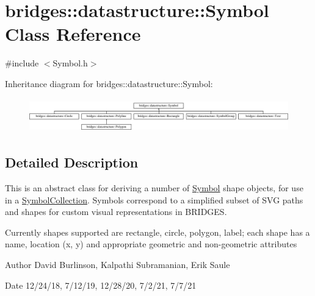 \hypertarget{classbridges_1_1datastructure_1_1_symbol}{}\section{bridges\+:\+:datastructure\+:\+:Symbol Class Reference}
\label{classbridges_1_1datastructure_1_1_symbol}


{\ttfamily \#include $<$Symbol.\+h$>$}

Inheritance diagram for bridges\+:\+:datastructure\+:\+:Symbol\+:\begin{figure}[H]
\begin{center}
\leavevmode
\includegraphics[height=1.500000cm]{classbridges_1_1datastructure_1_1_symbol}
\end{center}
\end{figure}


\subsection{Detailed Description}
This is an abstract class for deriving a number of \hyperlink{classbridges_1_1datastructure_1_1_symbol}{Symbol} shape objects, for use in a \hyperlink{classbridges_1_1datastructure_1_1_symbol_collection}{Symbol\+Collection}. Symbols correspond to a simplified subset of S\+VG paths and shapes for custom visual representations in B\+R\+I\+D\+G\+ES. 

Currently shapes supported are rectangle, circle, polygon, label; each shape has a name, location (x, y) and appropriate geometric and non-\/geometric attributes

\begin{DoxyAuthor}{Author}
David Burlinson, Kalpathi Subramanian, Erik Saule 
\end{DoxyAuthor}
\begin{DoxyDate}{Date}
12/24/18, 7/12/19, 12/28/20, 7/2/21, 7/7/21 
\end{DoxyDate}
